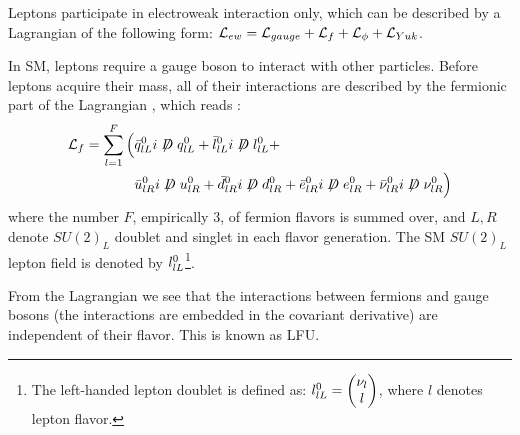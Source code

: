 Leptons participate in electroweak interaction only,
which can be described by a Lagrangian of the following form:
$\mathcal{L}_{ew} = \mathcal{L}_{gauge} + \mathcal{L}_{f} + \mathcal{L}_{\phi} + \mathcal{L}_{Yuk}$.

In SM, leptons require a gauge boson to interact with other particles.
Before leptons acquire their mass, all of their interactions are described by the fermionic part of the Lagrangian , 
which reads \cite{Langacker:2010zza}:
\begin{align}
    \Lden{f} = \sum_{l = 1}^F \Big(
        & \bar{\spin{q}}^0_{lL} i \fsl{D} \spin{q}^0_{lL} +
          \bar{\spin{l}}^0_{lL} i \fsl{D} \spin{l}^0_{lL} + \nonumber \\
        & \bar{u}^0_{lR} i \fsl{D} u^0_{lR} +
          \bar{d}^0_{lR} i \fsl{D} d^0_{lR} +
          \bar{e}^0_{lR} i \fsl{D} e^0_{lR} +
          \bar{\nu}^0_{lR} i \fsl{D} \nu^0_{lR}
    \Big)
\end{align}
where the number $F$, empirically 3, of fermion flavors is summed over, and
$L,R$ denote $SU(2)_L$ doublet and singlet in each flavor generation.
The SM $SU(2)_L$ lepton field is denoted by $l^0_{lL}$\footnote{
    The left-handed lepton doublet is defined as:
    $l^0_{lL} = \begin{pmatrix} \nu_l \\ l \end{pmatrix}$,
    where $l$ denotes lepton flavor.
}.

From the Lagrangian we see that the interactions between fermions and gauge
bosons (the interactions are embedded in the  covariant derivative) are independent
of their flavor.
This is known as LFU.